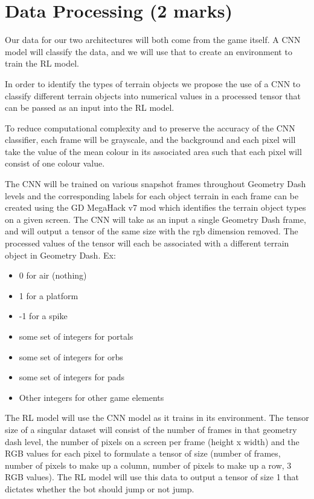 \documentclass{article} %
\begin{document}
\section{Data Processing (2 marks)}

Our data for our two architectures will both come from the game itself. A CNN 
model will classify the data, and we will use that to create an environment to 
train the RL model. 

In order to identify the types of terrain objects we propose the use of a CNN 
to classify different terrain objects into numerical values in a processed 
tensor that can be passed as an input into the RL model. 

To reduce computational complexity and to preserve the accuracy of the CNN 
classifier, each frame will be grayscale, and the background and each pixel 
will take the value of the mean colour in its associated area such that each 
pixel will consist of one colour value. 

The CNN will be trained on various snapshot frames throughout Geometry Dash 
levels and the corresponding labels for each object terrain in each frame can 
be created using the GD MegaHack v7 mod which identifies the terrain object 
types on a given screen. The CNN will take as an input a single Geometry Dash 
frame, and will output a tensor of the same size with the rgb dimension removed. 
The processed values of the tensor will each be associated with a different 
terrain object in Geometry Dash. Ex: 
\begin{itemize}
\item 0 for air (nothing)
\item 1 for a platform
\item -1 for a spike
\item some set of integers for portals
\item some set of integers for orbs
\item some set of integers for pads
\item Other integers for other game elements
\end{itemize}
The RL model will use the CNN model as it trains in its environment. The tensor 
size of a singular dataset will consist of the number of frames in that geometry 
dash level, the number of pixels on a screen per frame (height x width) and the 
RGB values for each pixel to formulate a tensor of size (number of frames, number 
of pixels to make up a column, number of pixels to make up a row, 3 RGB values). 
The RL model will use this data to output a tensor of size 1 that dictates 
whether 
the bot should jump or not jump. 
\end{document}
